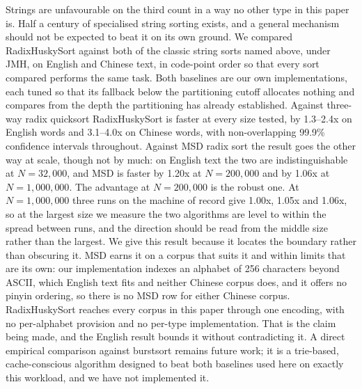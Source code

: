 \documentclass[twoside,leqno,twocolumn]{article}
\begin{document}
Strings are unfavourable on the third count in a way no other type in this paper is.
Half a century of specialised string sorting exists,
and a general mechanism should not be expected to beat it on its own ground.
We compared RadixHuskySort against both of the classic string sorts named above,
under JMH, on English and Chinese text, in code-point order so that every sort compared
performs the same task.
Both baselines are our own implementations,
each tuned so that its fallback below the partitioning cutoff allocates nothing
and compares from the depth the partitioning has already established.
Against three-way radix quicksort RadixHuskySort is faster at every size tested,
by 1.3--2.4x on English words and 3.1--4.0x on Chinese words,
with non-overlapping 99.9\% confidence intervals throughout.
Against MSD radix sort the result goes the other way at scale, though not by much:
on English text the two are indistinguishable at $N=32{,}000$,
and MSD is faster by 1.20x at $N=200{,}000$ and by 1.06x at $N=1{,}000{,}000$.
The advantage at $N=200{,}000$ is the robust one.
At $N=1{,}000{,}000$ three runs on the machine of record give 1.00x, 1.05x and 1.06x,
so at the largest size we measure the two algorithms are level to within the spread between runs,
and the direction should be read from the middle size rather than the largest.
We give this result because it locates the boundary rather than obscuring it.
MSD earns it on a corpus that suits it and within limits that are its own:
our implementation indexes an alphabet of 256 characters beyond ASCII,
which English text fits and neither Chinese corpus does,
and it offers no pinyin ordering,
so there is no MSD row for either Chinese corpus.
RadixHuskySort reaches every corpus in this paper through one encoding,
with no per-alphabet provision and no per-type implementation.
That is the claim being made, and the English result bounds it without contradicting it.
A direct empirical comparison against burstsort remains future work;
it is a trie-based, cache-conscious algorithm designed to beat both baselines used here on exactly this workload,
and we have not implemented it.
\end{document}
